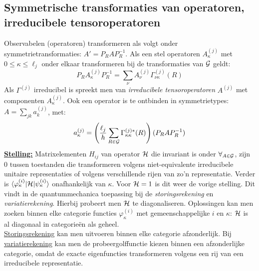 \subsection{Symmetrische transformaties van operatoren, irreducibele tensoroperatoren}
Observabelen (operatoren) transformeren als volgt onder symmetrietransformaties:
$A'=P_RAP_R^{-1}$. Als een stel operatoren $A^{(j)}_{\kappa}$ met $0\leq\kappa\leq\ell_j$
onder elkaar transformeren bij de transformaties van ${\cal{G}}$ geldt:
\[
P_RA_{\kappa}^{(j)}P_R^{-1}=\sum_{\nu}A_{\nu}^{(j)}\Gamma^{(j)}_{\nu\kappa}(R)
\]
Als $\Gamma^{(j)}$ irreducibel is spreekt men van {\it irreducibele
tensoroperatoren} $A^{(j)}$ met componenten $A^{(j)}_{\kappa}$.
\npar
Ook een operator is te ontbinden in symmetrietypes: $A=\sum\limits_{jk}a^{(j)}_k$,
met:
\[
a^{(j)}_{\kappa}=\left(\frac{\ell_j}{h}\sum_{R\in{\cal{G}}}\Gamma^{(j)*}_{\kappa\kappa}(R)\right)(P_RAP_R^{-1})
\]
\underline{\bf Stelling:} Matrixelementen $H_{ij}$ van operator ${\cal{H}}$ die
invariant is onder $\forall_{A\in{\cal{G}}}$, zijn 0 tussen toestanden die
transformeren volgens niet-equivalente irreducibele unitaire representaties
of volgens verschillende rijen van zo'n representatie. Verder is
$\langle\varphi^{(i)}_{\kappa}|{\cal{H}}|\psi^{(i)}_{\kappa}\rangle$ onafhankelijk
van $\kappa$. Voor ${\cal{H}}=1$ is dit weer de vorige stelling.
\npar
Dit vindt in de quantummechanica toepassing bij de {\it storingsrekening} en
{\it variatierekening}. Hierbij probeert men ${\cal{H}}$ te diagonaliseren. Oplossingen
kan men zoeken binnen elke categorie functies $\varphi^{(i)}_{\kappa}$ met
gemeenschappelijke $i$ en $\kappa$: ${\cal{H}}$ is al diagonaal in categorie\"en
als geheel.\\
\underline{Storingsrekening} kan men uitvoeren binnen elke categorie
afzonderlijk. Bij \underline{variatierekening} kan men de probeergolffunctie
kiezen binnen een afzonderlijke categorie, omdat de exacte eigenfuncties
transformeren volgens een rij van een irreducibele representatie.

